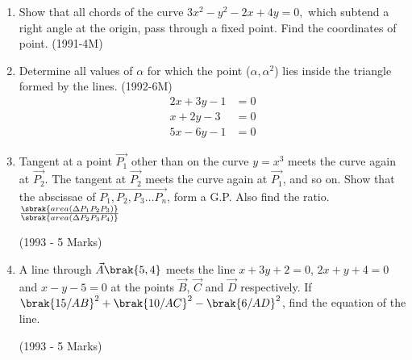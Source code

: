 \begin{enumerate}
\begin{center}
\end{center}

	
\item Show that all chords of  the curve $ 3x^2-y^2-2x+4y=0,$ which subtend a right angle at the origin, pass through a fixed point. Find the coordinates of point.     \hfill{(1991-4M)}

\item Determine all values of $\alpha$ for which the point ($\alpha , \alpha^2$) lies inside the triangle formed by the lines.  \hfill{(1992-6M)}
	\begin{align*}  2x+3y-1&=0\\ 
	x+2y-3&=0  \\ 5x-6y-1&=0   \end{align*}

	\item Tangent at a point $\vec{P_{1}}$ {other than } on the curve $y=x^{3}$ meets the curve again at $\vec{P_{2}}$. The tangent at $\vec{P_{2}}$ meets the curve again at $\vec{P_{1}}$, and so on. Show that the abscissae of $\vec{P_{1}, P_{2}, P_{3} \dots P_{n}}$, form a G.P. Also find the ratio. $\frac{\sbrak{area(\Delta P_{1}P_{2}P_{3})}}{\sbrak{area(\Delta P_{2}P_{3}P_{4})}}$

	\hfill{(1993 - 5 Marks)}

\item A line through $\vec{A} \brak{5, 4}$ meets the line $x+3y+2=0$, $2x+y+4=0$ and $x-y-5=0$ at the points $\vec{B}$, $\vec{C}$ and $\vec{D}$ respectively. If $\brak{15/AB}^{2}+\brak{10/AC}^{2}-\brak{6/AD}^{2}$, find the equation of the line.

	\hfill{(1993 - 5 Marks)}


\end{enumerate}
